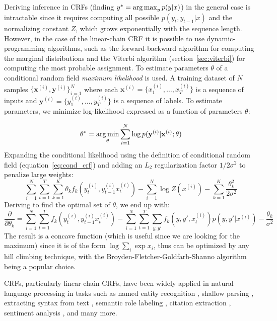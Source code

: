 Deriving inference in CRFs (finding 
$y^* = \operatorname*{arg\,max}_y p(y | x)$) 
in the general case is intractable since 
it requires computing all possible $p(y_t, y_{t - 1} | x)$ 
and the normalizing constant $Z$, which grows exponentially with the 
sequence length. 
However, in the case of the linear-chain CRF it is possible to 
use dynamic-programming algorithms, such as the
forward-backward algorithm \citep{devijver1985baum} 
for computing the marginal distributions and 
the Viterbi algorithm
(section~\ref{sec:viterbi}) for computing
the most probable assignment. 
To estimate parameters $\theta$ of a conditional 
random field \textit{maximum likelihood} is used.
A training dataset of $N$ samples $\{\mathbf{x}^{(i)}, \mathbf{y}^{(i)}\}^{N}_{i=1}$
where each $\mathbf{x}^{(i)} = \{x_{1}^{(i)}, \dots, x_{T}^{(i)}\}$
is a sequence of inputs
and $\mathbf{y}^{(i)} = \{y_{1}^{(i)}, \dots, y_{T}^{(i)}\}$ is 
a sequence of labels. To estimate parameters, we
minimize log-likelihood expressed as a function of parameters $\theta$:

$$
\theta^{*} = \operatorname*{arg\,min}_{\theta} \sum_{i=1}^{N} \log p(\mathbf{y}^{(i)} | \mathbf{x}^{(i)} ; \theta)
$$
Expanding the conditional likelihood using the definition of conditional random field
(equation~\ref{eq:cond_crf}) and adding an $L_2$ regularization factor $1/2 \sigma^2$ 
to penalize large weights:
$$
\sum_{i=1}^{N} \sum_{t=1}^{T} \sum_{k=1}^{K} \theta_k f_k (y_{t}^{(i)}, y_{t - 1}^{(i)} x_{t}^{(i)}) 
- \sum_{i=1}^N \log Z(x^{(i)}) - \sum_{k=1}^{K} \frac{\theta_{k}^{2}}{2 \sigma^2}
$$
Deriving to find the optimal set of $\theta$, we end up with:
$$
\frac{\partial }{\partial \theta_k} = \sum_{i=1}^{N} \sum_{t=1}^{T} f_k (y_{t}^{(i)}, y_{t - 1}^{(i)} x_{t}^{(i)}) 
- \sum_{i=1}^{N} \sum_{t=1}^{T} \sum_{y, y'} f_k (y, y', x_{t}^{(i)}) p(y, y'|x^{(i)}) - \frac{\theta_k}{\sigma^2}
$$
The result is a concave function (which is useful since we are looking for the 
maximum) since it is of the form $\log \sum_i \exp x_i$, thus can be optimized by
any hill climbing technique, with the 
Broyden-Fletcher-Goldfarb-Shanno algorithm \citep{liu1989limited} being a popular 
choice. 

CRFs, particularly linear-chain CRFs,
have been widely applied in natural language processing in tasks such as
named entity recognition \citep{liu2011recognizing}, shallow parsing \citep{sha2003shallow}, 
extracting syntax from text \citep{taskar2004max}, 
semantic role labeling \citep{cohn2005semantic}, citation extraction \citep{wellner2004integrated}, 
sentiment analysis \citep{patra2014ju_cse}, and many more. 

